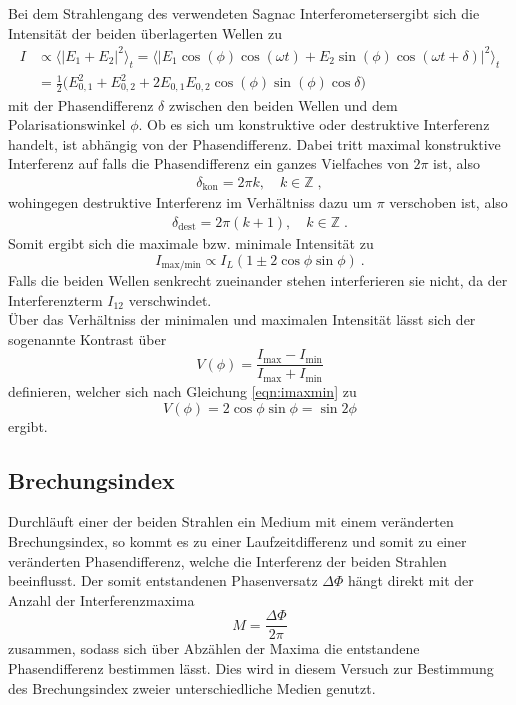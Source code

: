 Bei dem Strahlengang des verwendeten Sagnac Interferometersergibt sich die Intensität der beiden überlagerten Wellen zu
\begin{align}
  I &\propto \langle \lvert
  E_1+E_2 \rvert^2 \rangle_t =
  \langle \lvert E_1 \cos{(\phi)}\cos{(\omega t)} + E_2 \sin{(\phi)}\cos{(\omega t + \delta)} \rvert^2 \rangle_t \\
  &= \frac{1}{2} \bigl( E_{0,1}^2 + E_{0,2}^2 + 2E_{0,1}E_{0,2}\cos(\phi)\sin(\phi)\cos{\delta} \bigr)
\end{align}
mit der Phasendifferenz $\delta$ zwischen den beiden Wellen und dem  Polarisationswinkel $\phi$.
Ob es sich um konstruktive oder destruktive Interferenz handelt, ist abhängig von der Phasendifferenz.
Dabei tritt maximal konstruktive Interferenz auf falls die Phasendifferenz ein ganzes Vielfaches von $2\pi$
ist, also
\begin{align*}
  \delta_{\text{kon}}=2\pi k, \quad k \in \mathbb{Z} \; ,
\end{align*}
wohingegen destruktive Interferenz im Verhältniss dazu um $\pi$ verschoben ist, also
\begin{align*}
  \delta_{\text{dest}}=2\pi(k+1), \quad k \in \mathbb{Z}  \; .
\end{align*}
Somit ergibt sich die maximale bzw. minimale Intensität zu
\begin{equation}
  I_{\text{max/min}} \propto I_{L}(1\pm 2\cos{\phi}\sin{\phi}) \: .
  \label{eqn:imaxmin}
\end{equation}
Falls die beiden Wellen senkrecht zueinander stehen
interferieren sie nicht, da der Interferenzterm $I_{12}$ verschwindet.\\
Über das Verhältniss der minimalen und maximalen Intensität lässt sich der sogenannte Kontrast
über
\begin{equation}
  V(\phi)= \frac{I_{\text{max}}-I_{\text{min}}}{I_{\text{max}}+I_{\text{min}}}
  \label{eqn:Kontrasttheo}
\end{equation}
definieren, welcher sich nach Gleichung \eqref{eqn:imaxmin} zu
\begin{equation}
  V(\phi)=2\cos{\phi}\sin{\phi}=\sin{2\phi}
\end{equation}
ergibt.
\subsection{Brechungsindex}

Durchläuft einer der beiden Strahlen ein Medium mit einem veränderten Brechungsindex, so
kommt es zu einer Laufzeitdifferenz und somit zu einer veränderten Phasendifferenz,
welche die Interferenz der beiden Strahlen beeinflusst.
Der somit entstandenen Phasenversatz $\Delta \Phi$
hängt direkt mit der Anzahl der Interferenzmaxima
\begin{equation}
  M=\frac{\Delta \Phi}{2\pi}
  \label{eqn:AnzMax}
\end{equation}
zusammen, sodass sich über Abzählen der Maxima die entstandene Phasendifferenz bestimmen lässt.
Dies wird in diesem Versuch zur Bestimmung des Brechungsindex zweier unterschiedliche Medien genutzt.
